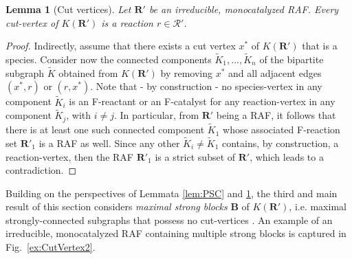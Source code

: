 \documentclass[pdflatex]{sn-jnl}
\theoremstyle{thmstyleone}%
\newtheorem{lemma}[theorem]{Lemma}%
\theoremstyle{examplesty}%
\theoremstyle{thmstylethree}%
\newcommand{\king}{K}
\newcommand{\RAF}[0]{\mathbf{R}'}
\newcommand{\block}[0]{\mathbf{B}}
\begin{document}
\vspace{6pt}
\begin{lemma}[Cut vertices]\label{lem:cutvert}
  Let $\RAF$ be an irreducible, monocatalyzed RAF. Every cut-vertex of
  $\king(\RAF)$ is a reaction $r\in \mathcal{R}'$.
\end{lemma}
\begin{proof}
  Indirectly, assume that there exists a cut vertex $x^*$ of $\king(\RAF)$
  that is a species. Consider now the connected components
  $\tilde{K}_1,...,\tilde{K}_n$ of the bipartite subgraph $\tilde{K}$
  obtained from $\king(\RAF)$ by removing $x^*$ and all adjacent edges
  $(x^*,r)$ or $(r,x^*)$. Note that - by construction - no species-vertex
  in any component $\tilde{\king}_i$ is an F-reactant or an F-catalyst for any
  reaction-vertex in any component $\tilde{\king}_j$, with $i\neq j$. In
  particular, from $\RAF$ being a RAF, it follows that there is at least
  one such connected component $\tilde{\king}_1$ whose associated F-reaction
  set $\RAF_1$ is a RAF as well. Since any other
  $\tilde{\king}_i \neq \tilde{\king}_1$ contains, by construction, a
  reaction-vertex, then the RAF $\RAF_1$ is a strict subset of $\RAF$,
  which leads to a contradiction.
\end{proof}

Building on the perspectives of Lemmata \ref{lem:PSC} and
\ref{lem:cutvert}, the third and main result of this section considers
\emph{maximal strong blocks} $\block$ of $\king(\RAF)$, i.e. maximal
strongly-connected subgraphs that possess no cut-vertices
\cite{grotschel_minimal_1979}.  An example of an irreducible, monocatalyzed
RAF containing multiple strong blocks is captured in
Fig.~\ref{ex:CutVertex2}.
\end{document}
